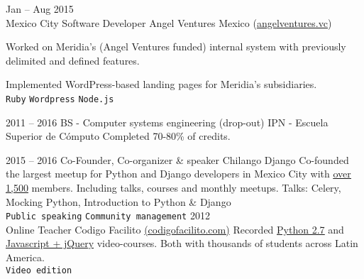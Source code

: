\documentclass[9pt]{developercv} %
\begin{document}
\begin{entrylist}
    \entry
        {
            Jan -- Aug 2015
            \\\footnotesize{Mexico City}
        }
        {Software Developer}
        {Angel Ventures Mexico ({\href{http://www.angelventures.vc/}{\underline{angelventures.vc}}})}
        {
            Worked on Meridia's (Angel Ventures funded) internal system with previously delimited and defined features. 

            Implemented WordPress-based landing pages for Meridia's subsidiaries.\\
            \texttt{Ruby}
            \slashsep\texttt{Wordpress}
            \slashsep\texttt{Node.js}
        }

\end{entrylist}



\begin{entrylist}
    \entry
        {2011 -- 2016}
        {BS - Computer systems engineering (drop-out)}
        {IPN - Escuela Superior de Cómputo}
        {Completed 70-80\% of credits.}
\end{entrylist}


\begin{entrylist}
    \entry
        {2015 -- 2016}
        {Co-Founder, Co-organizer \& speaker}
        {Chilango Django}
        {
            Co-founded the largest meetup for Python and Django developers in Mexico City with
            {\href{https://meetup.com/Chilango-Django/}{\underline{over 1,500}}}
            members. Including talks, courses and monthly meetups. \small{Talks: Celery, Mocking \w Python, Introduction to Python \& Django} \\
            \texttt{Public speaking}\slashsep
            \texttt{Community management}
        }
    \entry
        {2012\\\footnotesize{Online}}
        {Teacher}
        {Codigo Facilito {\href{(https://codigofacilito.com/}{(codigofacilito.com)}}}
        {
            Recorded 
            {\href{https://www.youtube.com/watch?v=CjmzDHMHxwU&list=PLE549A038CF82905F}{\underline{Python 2.7}}} 
            and {\href{https://www.youtube.com/watch?v=jKbjblt4NXA&list=PLpOqH6AE0tNi47LF-_6gddgq10lp_TLDB}{\underline{Javascript + jQuery}}} 
            video-courses. Both with thousands of students across Latin America.\\
            \texttt{Video edition}
        }
\end{entrylist}
\end{document}
